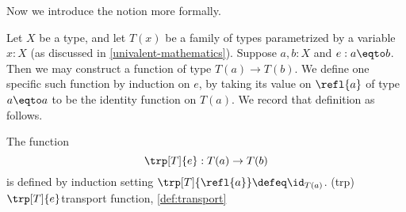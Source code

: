 Now we introduce the notion more formally.

Let $X$ be a type, and let $T(x)$ be a family of types parametrized by a variable $x:X$ (as discussed in \cref{univalent-mathematics}).
Suppose $a,b:X$ and $e:a \eqto b$.
Then we may construct a function of type $T(a) \to T(b)$.
We define one specific such function by induction on $e$,
by taking its value on $\refl{a}$ of type $a \eqto a$ to be the identity function on $T(a)$.
We record that definition as follows.

\begin{definition}\label{def:transport} The function
  \[
  \trp[T]{e} : T(a) \to T(b)
  \]
  is defined by induction setting $\trp[T]{\refl{a}} \defeq \id_{T(a)}$.%
  \glossary(trp){$\protect\trp[T]{e}$}{transport function, \cref{def:transport}}
\end{definition}

